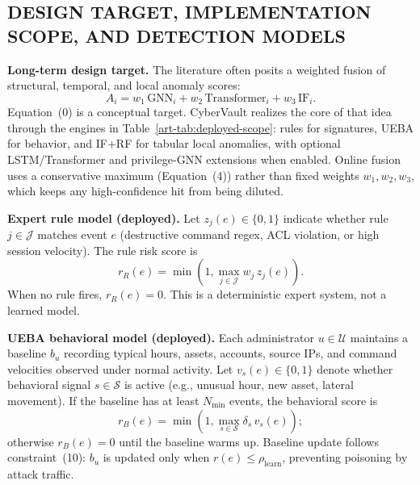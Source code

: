 \subsection{DESIGN TARGET, IMPLEMENTATION SCOPE, AND DETECTION MODELS}

\textbf{Long-term design target.} The literature often posits a weighted fusion of structural, temporal, and local anomaly scores:
\begin{equation}
A_i = w_1\,\mathrm{GNN}_i + w_2\,\mathrm{Transformer}_i + w_3\,\mathrm{IF}_i.
\tag{0}
\end{equation}
Equation~(0) is a conceptual target. CyberVault realizes the core of that idea through the engines in Table~\ref{art-tab:deployed-scope}: rules for signatures, UEBA for behavior, and IF+RF for tabular local anomalies, with optional LSTM/Transformer and privilege-GNN extensions when enabled. Online fusion uses a conservative maximum (Equation~(4)) rather than fixed weights $w_1,w_2,w_3$, which keeps any high-confidence hit from being diluted.

\textbf{Expert rule model (deployed).} Let $z_j(e)\in\{0,1\}$ indicate whether rule $j\in\mathcal{J}$ matches event $e$ (destructive command regex, ACL violation, or high session velocity). The rule risk score is
\begin{equation}
r_R(e)=\min\!\left(1,\max_{j\in\mathcal{J}} w_j\, z_j(e)\right).
\tag{1}
\end{equation}
When no rule fires, $r_R(e)=0$. This is a deterministic expert system, not a learned model.

\textbf{UEBA behavioral model (deployed).} Each administrator $u\in\mathcal{U}$ maintains a baseline $b_u$ recording typical hours, assets, accounts, source IPs, and command velocities observed under normal activity. Let $v_s(e)\in\{0,1\}$ denote whether behavioral signal $s\in\mathcal{S}$ is active (e.g., unusual hour, new asset, lateral movement). If the baseline has at least $N_{\min}$ events, the behavioral score is
\begin{equation}
r_B(e)=\min\!\left(1,\max_{s\in\mathcal{S}} \delta_s\, v_s(e)\right);
\tag{2}
\end{equation}
otherwise $r_B(e)=0$ until the baseline warms up. Baseline update follows constraint~(10): $b_u$ is updated only when $r(e)\leq\rho_{\mathrm{learn}}$, preventing poisoning by attack traffic.

